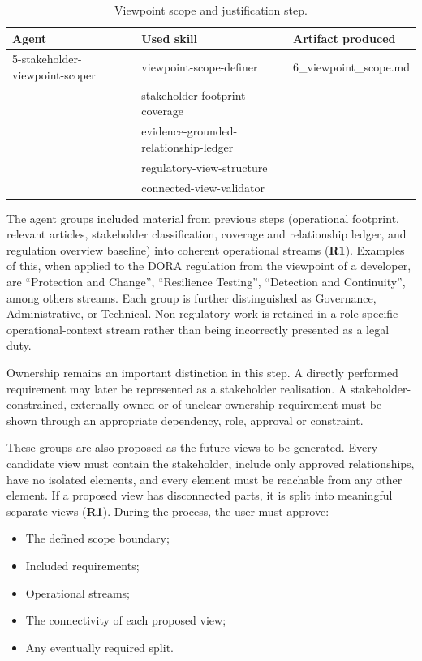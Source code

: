 \begin{table}[!bt]
\centering
\small
\begin{tabular}{p{5.2cm} p{5.5cm} p{3.5cm}}
\hline
\textbf{Agent} & \textbf{Used skill} & \textbf{Artifact produced} \\
\hline
5-stakeholder-viewpoint-scoper &
viewpoint-scope-definer &
6\_viewpoint\_scope.md \\
 &
stakeholder-footprint-coverage &
 \\
 &
evidence-grounded-relationship-ledger &
 \\
 &
regulatory-view-structure &
 \\
 &
connected-view-validator &
 \\
\hline
\end{tabular}
\caption{Viewpoint scope and justification step.}
\label{tab:viewpoint-scope}
\end{table}

The agent groups included material from previous steps (operational footprint, relevant articles, stakeholder classification, coverage and relationship ledger, and regulation overview baseline) into coherent operational streams (\textbf{R1}). Examples of this, when applied to the \ac{DORA} regulation from the viewpoint of a developer, are ``Protection and Change'', ``Resilience Testing'', ``Detection and Continuity'', among others streams. Each group is further distinguished as Governance, Administrative, or Technical. Non-regulatory work is retained in a role-specific operational-context stream rather than being incorrectly presented as a legal duty.

Ownership remains an important distinction in this step. A directly performed requirement may later be represented as a stakeholder realisation. A stakeholder-constrained, externally owned or of unclear ownership requirement must be shown through an appropriate dependency, role, approval or constraint.

These groups are also proposed as the future views to be generated. Every candidate view must contain the stakeholder, include only approved relationships, have no isolated elements, and every element must be reachable from any other element. If a proposed view has disconnected parts, it is split into meaningful separate views (\textbf{R1}). During the process, the user must approve:
\begin{itemize}
    \item The defined scope boundary;
    \item Included requirements;
    \item Operational streams;
    \item The connectivity of each proposed view;
    \item Any eventually required split.
\end{itemize}

